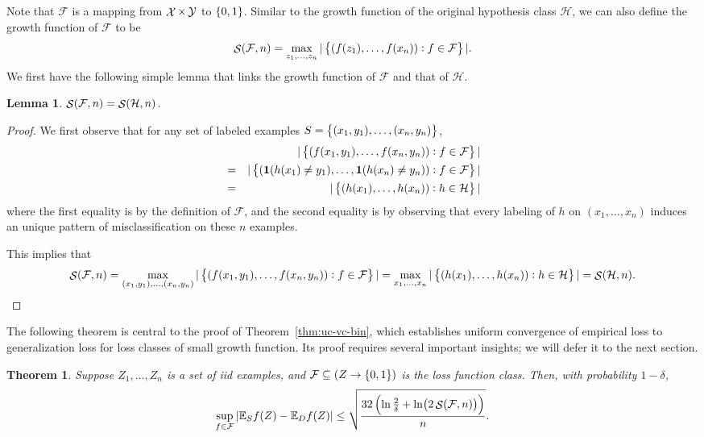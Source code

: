 \documentclass{article}
\newtheorem{theorem}{Theorem}
\newtheorem{lemma}{Lemma}
\DeclareMathOperator*{\Xcal}{{\cal X}}
\DeclareMathOperator*{\Ycal}{{\cal Y}}
\DeclareMathOperator*{\Scal}{{\cal S}}
\newcommand{\EE}{\mathbb{E}}
\newcommand{\Hcal}{\mathcal{H}}
\newcommand{\Fcal}{\mathcal{F}}
\newcommand*{\one}{{\bf 1}}
\begin{document}
Note that $\Fcal$ is a mapping from $\Xcal \times \Ycal$ to $\cbr{0,1}$. Similar to the growth function of the original hypothesis class $\Hcal$, we can also define the growth function of $\Fcal$ to be
\[ \Scal(\Fcal, n) = \max_{z_1,\ldots,z_n} |\cbr{(f(z_1), \ldots, f(x_n)): f \in \Fcal}|. \]
We first have the following simple lemma that links the growth function of $\Fcal$ and that of $\Hcal$.
\begin{lemma}
$\Scal(\Fcal, n) = \Scal(\Hcal, n)$.
\label{lem:growth}
\end{lemma}
\begin{proof}
We first observe that for any set of labeled examples
$S = \cbr{(x_1,y_1), \ldots, (x_n,y_n)}$,
\begin{eqnarray*}
  && |\cbr{(f(x_1, y_1), \ldots, f(x_n, y_n)): f \in \Fcal}| \\
  &=& |\cbr{(\one(h(x_1) \neq y_1), \ldots, \one(h(x_n) \neq y_n)): f \in \Fcal}| \\
  &=& |\cbr{(h(x_1), \ldots, h(x_n)): h \in \Hcal}|
\end{eqnarray*}
where the first equality is by the definition of $\Fcal$, and the second
equality is by observing that every labeling of $h$ on $(x_1,\ldots,x_n)$
induces an unique pattern of misclassification on these $n$ examples.

This implies that
\[ \Scal(\Fcal, n)
= \max_{(x_1,y_1),\ldots,(x_n,y_n)} |\cbr{(f(x_1, y_1), \ldots, f(x_n, y_n)): f \in \Fcal}|
= \max_{x_1,\ldots,x_n}|\cbr{(h(x_1), \ldots, h(x_n)): h \in \Hcal}|
= \Scal(\Hcal, n). \]
\end{proof}

The following theorem is central to the proof of Theorem~\ref{thm:uc-vc-bin}, which establishes uniform convergence of empirical loss to generalization loss for loss classes
of small growth function. Its proof requires several important insights; we will defer it to the next section.

\begin{theorem}
Suppose $Z_1,\ldots,Z_n$ is a set of iid examples, and $\Fcal \subseteq (Z \to \cbr{0,1})$ is the loss function class.
Then, with probability $1-\delta$,
\[ \sup_{f \in \Fcal} |\EE_S f(Z) - \EE_D f(Z)| \leq \sqrt{\frac{32\del{\ln\frac{2}{\delta} + \ln(2\Scal(\Fcal, n))}}{n}}. \]
\label{thm:uc-vc}
\end{theorem}
\end{document}
